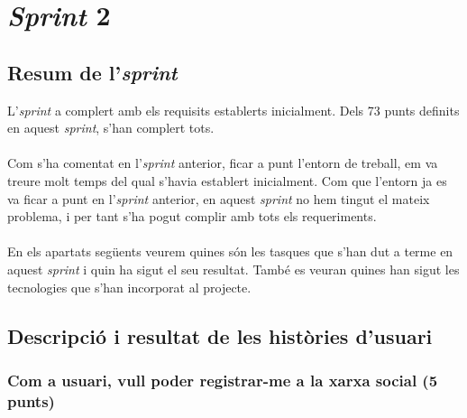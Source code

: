 \documentclass[11pt,catalan,listoffigures,listoftables]{tfgetsinf}
\begin{document}
\section{\textit{Sprint} 2}

\subsection{Resum de l'\textit{sprint}}

L'\textit{sprint} a complert amb els requisits establerts inicialment. Dels 73 punts definits en aquest \textit{sprint}, s'han complert tots.\\ \\
Com s'ha comentat en l'\textit{sprint} anterior, ficar a punt l'entorn de treball, em va treure molt temps del qual s'havia establert inicialment. Com que l'entorn ja es va ficar a punt en l'\textit{sprint} anterior, en aquest \textit{sprint} no hem tingut el mateix problema, i per tant s'ha pogut complir amb tots els requeriments.\\ \\
En els apartats següents veurem quines són les tasques que s'han dut a terme en aquest \textit{sprint} i quin ha sigut el seu resultat. També es veuran quines han sigut les tecnologies que s'han incorporat al projecte.

\subsection{Descripció i resultat de les històries d'usuari}

\subsubsection{Com a usuari, vull poder registrar-me a la xarxa social (5 punts)}
\end{document}
